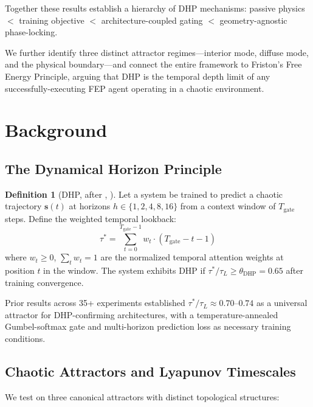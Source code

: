 \documentclass[12pt]{article}
\theoremstyle{definition}
\newtheorem{definition}{Definition}
\begin{document}
Together these results establish a hierarchy of DHP mechanisms: passive physics
$<$ training objective $<$ architecture-coupled gating $<$ geometry-agnostic
phase-locking.

We further identify three distinct attractor regimes---interior mode, diffuse mode,
and the physical boundary---and connect the entire framework to Friston's Free Energy
Principle, arguing that DHP is the temporal depth limit of any successfully-executing
FEP agent operating in a chaotic environment.

\section{Background}

\subsection{The Dynamical Horizon Principle}

\begin{definition}[DHP, after \citeauthor{archon2026d}, \citeyear{archon2026d}]
Let a system be trained to predict a chaotic trajectory $\mathbf{s}(t)$ at horizons
$h \in \{1, 2, 4, 8, 16\}$ from a context window of $T_{\text{gate}}$ steps.
Define the weighted temporal lookback:
\begin{equation}
  \tau^* = \sum_{t=0}^{T_{\text{gate}}-1} w_t \cdot (T_{\text{gate}} - t - 1)
\end{equation}
where $w_t \geq 0$, $\sum_t w_t = 1$ are the normalized temporal attention weights at
position $t$ in the window. The system exhibits DHP if
$\tau^*/\tau_L \geq \theta_{\text{DHP}} = 0.65$ after training convergence.
\end{definition}

Prior results across 35+ experiments \citep{archon2026a,archon2026b,archon2026c,archon2026d,archon2026e}
established $\tau^*/\tau_L \approx 0.70$--$0.74$ as a universal attractor for
DHP-confirming architectures, with a temperature-annealed Gumbel-softmax gate and
multi-horizon prediction loss as necessary training conditions.

\subsection{Chaotic Attractors and Lyapunov Timescales}

We test on three canonical attractors with distinct topological structures:
\end{document}
